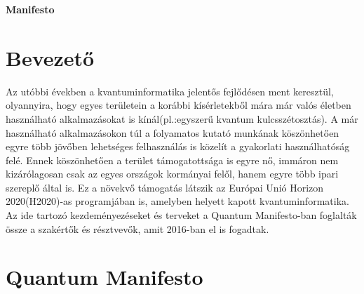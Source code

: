 \clearpage
\begin{center}
\large
\textbf{Manifesto}\\
\end{center}

\section*{Bevezető}
Az utóbbi években a kvantuminformatika jelentős fejlődésen ment keresztül, olyannyira, hogy egyes területein a korábbi kísérletekből mára már valós életben használható alkalmazásokat is kínál(pl.:egyszerű kvantum kulcsszétosztás). A már használható alkalmazásokon túl a folyamatos kutató munkának köszönhetően  egyre több jövőben lehetséges felhasználás is közelít a gyakorlati használhatóság felé. Ennek köszönhetően a terület támogatottsága is egyre nő, immáron nem kizárólagosan csak az egyes országok kormányai felől, hanem egyre több ipari szereplő által is. Ez a növekvő támogatás látszik az Európai Unió Horizon 2020(H2020)-as programjában is, amelyben helyett kapott kvantuminformatika. Az ide tartozó kezdeményezéseket és terveket a Quantum Manifesto-ban foglalták össze a szakértők és résztvevők, amit 2016-ban el is fogadtak.

\section*{Quantum Manifesto}

